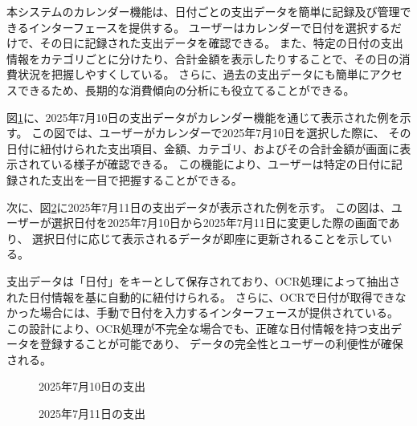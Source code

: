 \documentclass[main]{subfiles}
\begin{document}
本システムのカレンダー機能は、日付ごとの支出データを簡単に記録及び管理できるインターフェースを提供する。
ユーザーはカレンダーで日付を選択するだけで、その日に記録された支出データを確認できる。
また、特定の日付の支出情報をカテゴリごとに分けたり、合計金額を表示したりすることで、その日の消費状況を把握しやすくしている。
さらに、過去の支出データにも簡単にアクセスできるため、長期的な消費傾向の分析にも役立てることができる。

図\ref{fig:7-10}に、2025年7月10日の支出データがカレンダー機能を通じて表示された例を示す。
この図では、ユーザーがカレンダーで2025年7月10日を選択した際に、
その日付に紐付けられた支出項目、金額、カテゴリ、およびその合計金額が画面に表示されている様子が確認できる。
この機能により、ユーザーは特定の日付に記録された支出を一目で把握することができる。

次に、図\ref{fig:7-11}に2025年7月11日の支出データが表示された例を示す。
この図は、ユーザーが選択日付を2025年7月10日から2025年7月11日に変更した際の画面であり、
選択日付に応じて表示されるデータが即座に更新されることを示している。

支出データは「日付」をキーとして保存されており、OCR処理によって抽出された日付情報を基に自動的に紐付けられる。
さらに、OCRで日付が取得できなかった場合には、手動で日付を入力するインターフェースが提供されている。
この設計により、OCR処理が不完全な場合でも、正確な日付情報を持つ支出データを登録することが可能であり、
データの完全性とユーザーの利便性が確保される。

\begin{figure}[tb]
    \begin{center}
        \caption{2025年7月10日の支出}
        \label{fig:7-10}
    \end{center}
\end{figure}

\begin{figure}[tb]
    \begin{center}
        \caption{2025年7月11日の支出}
        \label{fig:7-11}
    \end{center}
\end{figure}
\end{document}
